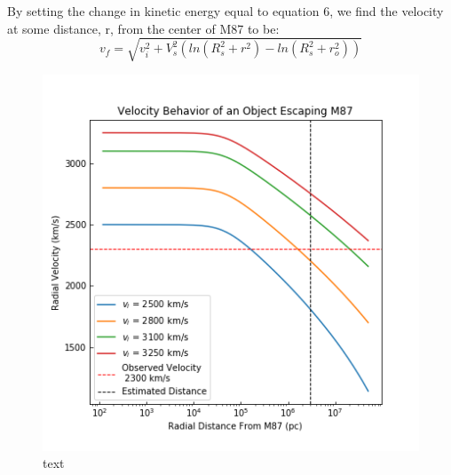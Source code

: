 \documentclass{aastex62}
\begin{document}
By setting the change in kinetic energy equal to equation 6, we find the velocity at some distance, r, from the center of M87 to be:
\begin{equation}
v_{f} = \sqrt{v_{i}^2 + V_{s}^{2}(ln(R_{s}^2 + r^2) - ln(R_{s}^2 + r_{o}^2))}
\end{equation}
\begin{figure}
\includegraphics[scale=0.6]{./Images/velocity_behavior.png}
\centering
\caption{text}
\end{figure}
\end{document}
